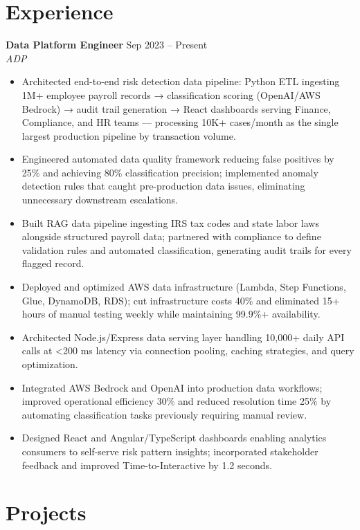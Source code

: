 \documentclass[10pt,letterpaper]{article}
\newcommand{\entry}[3]{%
  \vspace{3pt}\textbf{#1} \hfill #3 \\
  \textit{\small #2}\vspace{1pt}}
\begin{document}
\section{Experience}

\entry{Data Platform Engineer}{ADP}{Sep 2023 -- Present}
\begin{itemize}
  \item Architected end-to-end risk detection data pipeline: Python ETL ingesting 1M+ employee payroll records → classification scoring (OpenAI/AWS Bedrock) → audit trail generation → React dashboards serving Finance, Compliance, and HR teams --- processing 10K+ cases/month as the single largest production pipeline by transaction volume.
  \item Engineered automated data quality framework reducing false positives by 25\% and achieving 80\% classification precision; implemented anomaly detection rules that caught pre-production data issues, eliminating unnecessary downstream escalations.
  \item Built RAG data pipeline ingesting IRS tax codes and state labor laws alongside structured payroll data; partnered with compliance to define validation rules and automated classification, generating audit trails for every flagged record.
  \item Deployed and optimized AWS data infrastructure (Lambda, Step Functions, Glue, DynamoDB, RDS); cut infrastructure costs 40\% and eliminated 15+ hours of manual testing weekly while maintaining 99.9\%+ availability.
  \item Architected Node.js/Express data serving layer handling 10,000+ daily API calls at \textless{}200 ms latency via connection pooling, caching strategies, and query optimization.
  \item Integrated AWS Bedrock and OpenAI into production data workflows; improved operational efficiency 30\% and reduced resolution time 25\% by automating classification tasks previously requiring manual review.
  \item Designed React and Angular/TypeScript dashboards enabling analytics consumers to self-serve risk pattern insights; incorporated stakeholder feedback and improved Time-to-Interactive by 1.2 seconds.
\end{itemize}

\section{Projects}
\end{document}
